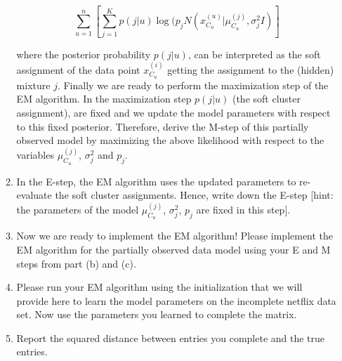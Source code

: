 \begin{enumerate}
\begin{enumerate}
$$ \sum^n_{u=1} \left[ \sum^{K}_{j=1} p(j|u) \log( p_j N(x^{(u)}_{C_u} | \mu^{(j)}_{C_u}, \sigma^2_j I) \right]$$

where the posterior probability $p(j|u)$, can be interpreted as the soft assignment of the data point $x^{(i)}_{C_u}$ getting the assignment to the (hidden) mixture $j$. Finally we are ready to perform the maximization step of the EM algorithm. In the maximization step $p(j|u)$ (the soft cluster assignment), are fixed and we update the model parameters with respect to this fixed posterior. Therefore, derive the M-step of this partially observed model by maximizing the above likelihood with respect to the variables $\mu^{(j)}_{C_u}$, $\sigma^2_j$ and $p_j$.

\item In the E-step, the EM algorithm uses the updated parameters to re-evaluate the soft cluster assignments. Hence, write down the E-step [hint: the parameters of the model $\mu^{(j)}_{C_u}$, $\sigma^2_j$, $p_j$ are fixed in this step].

\item Now we are ready to implement the EM algorithm! Please implement the EM algorithm for the partially observed data model using your E and M steps from part (b) and (c).

\item Please run your EM algorithm using the initialization that we will provide here to learn the model parameters on the incomplete netflix data set. Now use the parameters you learned to complete the matrix.

\item Report the squared distance between entries you complete and the true entries.

\end{enumerate} 


\end{enumerate}





